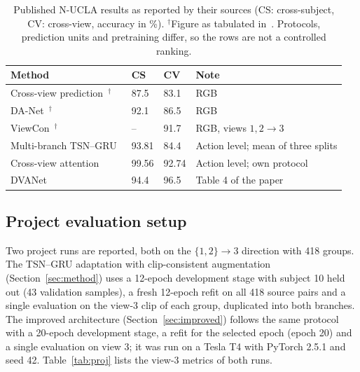 \documentclass[runningheads]{llncs}
\begin{document}
\begin{table}[tb]
\caption{Published N-UCLA results as reported by their sources (CS: cross-subject, CV: cross-view, accuracy in \%). $^\dagger$Figure as tabulated in~\cite{dva}. Protocols, prediction units and pretraining differ, so the rows are not a controlled ranking.}\label{tab:pub}
\centering\small
\begin{tabular}{@{}p{4.0cm}p{1.1cm}p{1.1cm}p{4.9cm}@{}}
\toprule
Method & CS & CV & Note\\\midrule
Cross-view prediction~\cite{vyas}$^\dagger$ & 87.5 & 83.1 & RGB\\
DA-Net~\cite{danet}$^\dagger$ & 92.1 & 86.5 & RGB\\
ViewCon~\cite{viewcon}$^\dagger$ & -- & 91.7 & RGB, views $1,2\to3$\\
Multi-branch TSN--GRU~\cite{bui} & 93.81 & 84.4 & Action level; mean of three splits\\
Cross-view attention~\cite{cva} & 99.56 & 92.74 & Action level; own protocol\\
DVANet~\cite{dva} & 94.4 & 96.5 & Table 4 of the paper\\\bottomrule
\end{tabular}
\end{table}

\subsection{Project evaluation setup}
Two project runs are reported, both on the $\{1,2\}\to3$ direction with 418 groups. The TSN--GRU adaptation with clip-consistent augmentation (Section~\ref{sec:method}) uses a 12-epoch development stage with subject 10 held out (43 validation samples), a fresh 12-epoch refit on all 418 source pairs and a single evaluation on the view-3 clip of each group, duplicated into both branches. The improved architecture (Section~\ref{sec:improved}) follows the same protocol with a 20-epoch development stage, a refit for the selected epoch (epoch 20) and a single evaluation on view 3; it was run on a Tesla T4 with PyTorch 2.5.1 and seed 42. Table~\ref{tab:proj} lists the view-3 metrics of both runs.
\end{document}
